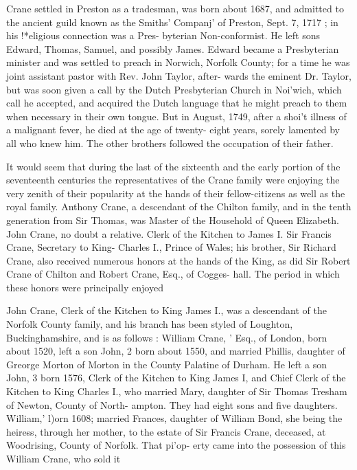 \documentclass[oneside]{book}
\begin{document}
Crane settled in Preston as a tradesman, was born about 1687, 
and admitted to the ancient guild known as the Smiths' Companj' 
of Preston, Sept. 7, 1717 ; in his !*eligious connection was a Pres- 
byterian Non-conformist. He left sons Edward, Thomas, Samuel, 
and possibly James. Edward became a Presbyterian minister 
and was settled to preach in Norwich, Norfolk County; for a 
time he was joint assistant pastor with Rev. John Taylor, after- 
wards the eminent Dr. Taylor, but was soon given a call by the 
Dutch Presbyterian Church in Noi'wich, which call he accepted, 
and acquired the Dutch language that he might preach to them 
when necessary in their own tongue. But in August, 1749, after 
a shoi't illness of a malignant fever, he died at the age of twenty- 
eight years, sorely lamented by all who knew him. The other 
brothers followed the occupation of their father. 

It would seem that during the last of the sixteenth and the 
early portion of the seventeenth centuries the representatives of 
the Crane family were enjoying the very zenith of their popularity 
at the hands of their fellow-citizens as well as the royal family. 
Anthony Crane, a descendant of the Chilton family, and in the 
tenth generation from Sir Thomas, was Master of the Household 
of Queen Elizabeth. John Crane, no doubt a relative. Clerk of 
the Kitchen to James I. Sir Francis Crane, Secretary to King- 
Charles I., Prince of Wales; his brother, Sir Richard Crane, 
also received numerous honors at the hands of the King, as did 
Sir Robert Crane of Chilton and Robert Crane, Esq., of Cogges- 
hall. The period in which these honors were principally enjoyed 

John Crane, Clerk of the Kitchen to King James I., was a 
descendant of the Norfolk County family, and his branch has 
been styled of Loughton, Buckinghamshire, and is as follows : 
William Crane, ' Esq., of London, born about 1520, left a son 
John, 2 born about 1550, and married Phillis, daughter of Greorge 
Morton of Morton in the County Palatine of Durham. He left a 
son John, 3 born 1576, Clerk of the Kitchen to King James I, and 
Chief Clerk of the Kitchen to King Charles I., who married Mary, 
daughter of Sir Thomas Tresham of Newton, County of North- 
ampton. They had eight sons and five daughters. William,' 
l)orn 1608; married Frances, daughter of William Bond, she 
being the heiress, through her mother, to the estate of Sir Francis 
Crane, deceased, at Woodrising, County of Norfolk. That pi'op- 
erty came into the possession of this William Crane, who sold it 
\end{document}
